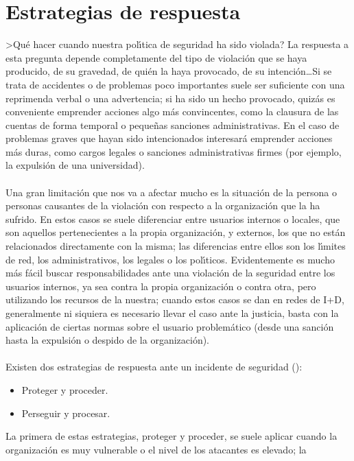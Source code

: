 \section{Estrategias de respuesta}
>Qu\'e hacer cuando nuestra pol\'{\i}tica de seguridad ha sido violada? La 
respuesta a esta pregunta depende completamente del tipo de violaci\'on que se
haya producido, de su gravedad, de qui\'en la haya provocado, de su 
intenci\'on\ldots Si se trata de accidentes o de problemas poco importantes
suele ser suficiente con una reprimenda verbal o una advertencia; si ha sido
un hecho provocado, quiz\'as es conveniente emprender acciones algo m\'as 
convincentes, como la clausura de las cuentas de forma temporal o peque\~nas
sanciones administrativas. En el caso de problemas graves que hayan sido
intencionados interesar\'a emprender acciones m\'as duras, como cargos legales
o sanciones administrativas firmes (por ejemplo, la expulsi\'on de una 
universidad).\\
\\Una gran limitaci\'on que nos va a afectar mucho es la situaci\'on de la 
persona o personas causantes de la violaci\'on con respecto a la organizaci\'on
que la ha sufrido. En estos casos se suele diferenciar entre usuarios internos
o locales, que son aquellos pertenecientes a la propia organizaci\'on, y
externos, los que no est\'an relacionados directamente con la misma; las 
diferencias entre ellos son los l\'{\i}mites de red, los administrativos, los
legales o los pol\'{\i}ticos. Evidentemente es mucho m\'as f\'acil buscar
responsabilidades ante una violaci\'on de la seguridad entre los usuarios
internos, ya sea contra la propia organizaci\'on o contra otra, pero utilizando
los recursos de la nuestra; cuando estos casos se dan en redes de I+D, 
generalmente ni siquiera es necesario llevar el caso ante la justicia, basta
con la aplicaci\'on de ciertas normas sobre el usuario problem\'atico (desde
una sanci\'on hasta la expulsi\'on o despido de la organizaci\'on).\\
\\Existen dos estrategias de respuesta ante un incidente de seguridad 
(\cite{kn:siy95}):
\begin{itemize}
\item Proteger y proceder.
\item Perseguir y procesar.
\end{itemize}
La primera de estas estrategias, proteger y proceder, se suele aplicar cuando
la organizaci\'on es muy vulnerable o el nivel de los atacantes es elevado; la
